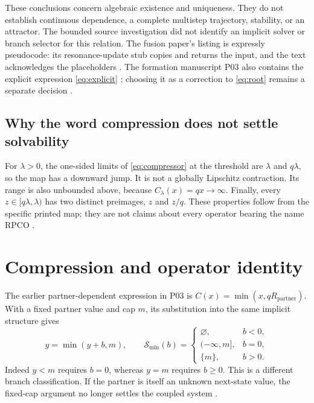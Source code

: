 \documentclass[11pt,a4paper]{article}
\theoremstyle{definition}
\numberwithin{equation}{section}
\begin{document}
These conclusions concern algebraic existence and uniqueness. They do not
establish continuous dependence, a complete multistep trajectory, stability,
or an attractor. The bounded source investigation did not identify an
implicit solver or branch selector for this relation. The fusion paper's
listing is expressly pseudocode: its resonance-update stub copies and
returns the input, and the text acknowledges the placeholders
\cite[physical pp.~22--24]{P01}. The formation manuscript P03 also contains
the explicit expression \eqref{eq:explicit} \cite[physical p.~2, \S1.1]{P03};
choosing it as a correction to \eqref{eq:root} remains a separate decision
\cite[\S3.4]{F01}.

\subsection{Why the word compression does not settle solvability}

For $\lambda>0$, the one-sided limits of \eqref{eq:compressor} at the threshold
are $\lambda$ and $q\lambda$, so the map has a downward jump. It is not a
globally Lipschitz contraction. Its range is also unbounded above, because
$C_\lambda(x)=qx\to\infty$. Finally, every
$z\in[q\lambda,\lambda)$ has two distinct preimages, $z$ and $z/q$.
These properties follow from the specific printed map; they are not claims
about every operator bearing the name RPCO \cite[\S3.3]{F01}.

\section{Compression and operator identity}\label{sec:compression}

The earlier partner-dependent expression in P03 is
$C(x)=\min(x,qR_{\mathrm{partner}})$. With a fixed partner value and cap
$m$, its substitution into the same implicit structure gives
\begin{equation}
 y=\min(y+b,m),\qquad
 \mathcal S_{\min}(b)=
 \begin{cases}
 \varnothing,&b<0,\\
 (-\infty,m],&b=0,\\
 \{m\},&b>0.
 \end{cases}
\end{equation}
Indeed $y<m$ requires $b=0$, whereas $y=m$ requires $b\geq0$.
This is a different branch classification. If the partner is itself an
unknown next-state value, the fixed-cap argument no longer settles the
coupled system \cite[physical p.~6, \S2.5]{P03} \cite[\S1]{Branch}.
\end{document}
